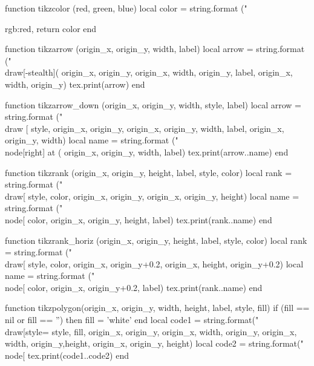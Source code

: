 \begin{luacode*}
function tikzcolor (red, green, blue)
	 local color = string.format ("{rgb:red,%
	 return color
end

function tikzarrow (origin_x, origin_y, width, label)
	 local arrow = string.format ("\\draw[-stealth](%
																origin_x, origin_y, origin_x, width, origin_y, label, origin_x, width, origin_y)
	 tex.print(arrow)
end

function tikzarrow_down (origin_x, origin_y, width, style, label)
	 local arrow = string.format ("\\draw [%
																style, origin_x, origin_y, origin_x, origin_y, width, label, origin_x, origin_y, width)
	 local name = string.format ("\\node[right] at (%
															 origin_x, origin_y, width, label)
	 tex.print(arrow..name)
end

function tikzrank (origin_x, origin_y, height, label, style, color)
	 local rank = string.format ("\\draw[%
															 style, color, origin_x, origin_y, origin_x, origin_y, height)
	 local name = string.format ("\\node[%
															 color, origin_x, origin_y, height, label)
	 tex.print(rank..name)
end

function tikzrank_horiz (origin_x, origin_y, height, label, style, color)
	 local rank = string.format ("\\draw[%
															 style, color, origin_x, origin_y+0.2, origin_x, height, origin_y+0.2)
	 local name = string.format ("\\node[%
															 color, origin_x, origin_y+0.2, label)
	 tex.print(rank..name)
end

function tikzpolygon(origin_x, origin_y, width, height, label, style, fill)
	 if (fill == nil or fill == '') then
			fill = 'white'
	 end
	 local code1 = string.format("\\draw[style=%
															 style, fill, origin_x, origin_y, origin_x, width, origin_y, origin_x, width,
															 origin_y,height, origin_x, origin_y, height)
	 local code2 =
			string.format("\\node[%
	 tex.print(code1..code2)
end

}
\end{luacode*}
